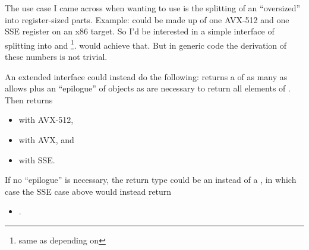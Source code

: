 The use case I came across when wanting to use  is the splitting of
an “oversized” \simd into register-sized parts.
Example:  could be made up of one AVX-512 and
one SSE register on an x86 target.
So I'd be interested in a simple interface of splitting
 into  and
%
\footnote{same as  depending on
}.
\stdx{} would achieve that.
But in generic code the derivation of these numbers is not trivial.

An extended  interface could instead do the following:
 returns a  of as many
 as  allows plus an “epilogue” of
 objects as are necessary to return all
elements of .
Then  returns
\begin{itemize}
  \item {} with AVX-512,
  \item {} with AVX, and
  \item {} with SSE.
\end{itemize}
If no “epilogue” is necessary, the return type could be an  instead
of a , in which case the SSE case above would instead return
\begin{itemize}
  \item {}.
\end{itemize}

